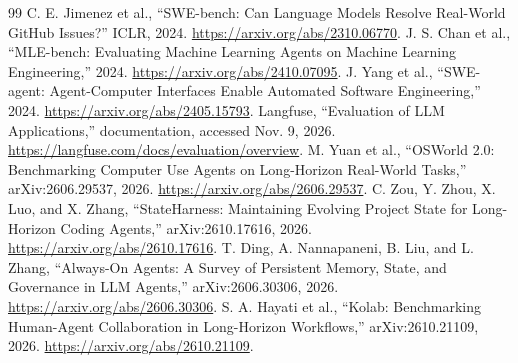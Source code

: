 \documentclass[twocolumn]{article}
\begin{document}
\begin{thebibliography}{99}
 C. E. Jimenez et al., ``SWE-bench: Can Language Models Resolve Real-World GitHub Issues?'' ICLR, 2024. \url{https://arxiv.org/abs/2310.06770}.
 J. S. Chan et al., ``MLE-bench: Evaluating Machine Learning Agents on Machine Learning Engineering,'' 2024. \url{https://arxiv.org/abs/2410.07095}.
 J. Yang et al., ``SWE-agent: Agent-Computer Interfaces Enable Automated Software Engineering,'' 2024. \url{https://arxiv.org/abs/2405.15793}.
 Langfuse, ``Evaluation of LLM Applications,'' documentation, accessed Nov. 9, 2026. \url{https://langfuse.com/docs/evaluation/overview}.
 M. Yuan et al., ``OSWorld 2.0: Benchmarking Computer Use Agents on Long-Horizon Real-World Tasks,'' arXiv:2606.29537, 2026. \url{https://arxiv.org/abs/2606.29537}.
 C. Zou, Y. Zhou, X. Luo, and X. Zhang, ``StateHarness: Maintaining Evolving Project State for Long-Horizon Coding Agents,'' arXiv:2610.17616, 2026. \url{https://arxiv.org/abs/2610.17616}.
 T. Ding, A. Nannapaneni, B. Liu, and L. Zhang, ``Always-On Agents: A Survey of Persistent Memory, State, and Governance in LLM Agents,'' arXiv:2606.30306, 2026. \url{https://arxiv.org/abs/2606.30306}.
 S. A. Hayati et al., ``Kolab: Benchmarking Human-Agent Collaboration in Long-Horizon Workflows,'' arXiv:2610.21109, 2026. \url{https://arxiv.org/abs/2610.21109}.
\end{thebibliography}
\end{document}
